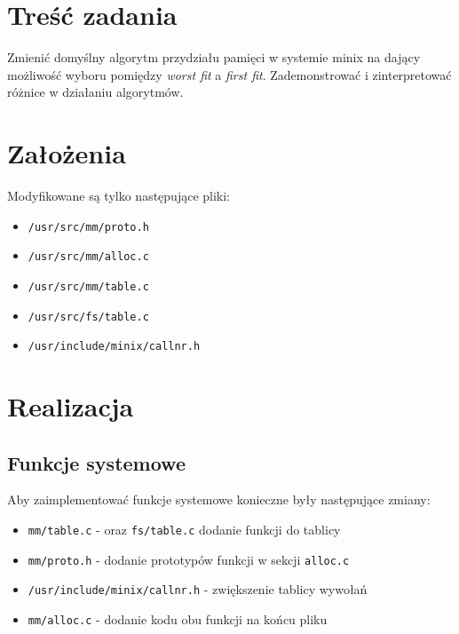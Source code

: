 \documentclass[12pt,a4paper]{article}
\begin{document}
\section{Treść zadania}
Zmienić domyślny algorytm przydziału pamięci w systemie minix na dający możliwość wyboru pomiędzy \emph{worst fit} a \emph{first fit}.
Zademonstrować i zinterpretować różnice w działaniu algorytmów.

\section{Założenia}
Modyfikowane są tylko następujące pliki:
\begin{itemize}
\item \texttt{/usr/src/mm/proto.h}
\item \texttt{/usr/src/mm/alloc.c}
\item \texttt{/usr/src/mm/table.c}
\item \texttt{/usr/src/fs/table.c}
\item \texttt{/usr/include/minix/callnr.h}
\end{itemize}

\section{Realizacja}
\subsection{Funkcje systemowe}
Aby zaimplementować funkcje systemowe konieczne były następujące zmiany:
\begin{itemize}
	\item \texttt{mm/table.c} - oraz \texttt{fs/table.c} dodanie funkcji do tablicy
	\item \texttt{mm/proto.h} - dodanie prototypów funkcji w sekcji \texttt{alloc.c}
	\item \texttt{/usr/include/minix/callnr.h} - zwiększenie tablicy wywołań
	\item \texttt{mm/alloc.c} - dodanie kodu obu funkcji na końcu pliku
\end{itemize}
\end{document}

